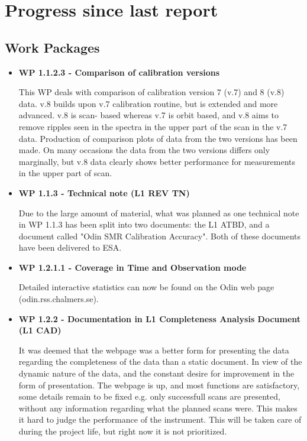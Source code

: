 \chapter{Progress since last report}
\label{chapter:progress}


\section{Work Packages}

\begin{itemize}

\item{\bf WP 1.1.2.3 - Comparison of calibration versions}

This WP deals with comparison of calibration version 7 (v.7) and 8 (v.8) data. v.8
builds upon v.7 calibration routine, but is extended and more advanced. v.8 is scan-
based whereas v.7 is orbit based, and v.8 aims to remove ripples seen in the spectra
in the upper part of the scan in the v.7 data.
Production of comparison plots of data from the two versions has been made. On many
occasions the data from the two versions differs only marginally, but v.8 data clearly
shows better performance for measurements in the upper part of scan.


\item{\bf WP 1.1.3 - Technical note (L1 REV TN)}

Due to the large amount of material, what was planned as one technical note in WP
1.1.3 has been split into two documents: the L1 ATBD, and a document called "Odin
SMR Calibration Accuracy". Both of these documents have been delivered to ESA. 


\item{\bf WP 1.2.1.1 - Coverage in Time and Observation mode}

Detailed interactive statistics can now be found on the Odin web page (odin.rss.chalmers.se). 


\item{\bf WP 1.2.2 - Documentation in L1 Completeness Analysis Document (L1 CAD)
}

It was deemed that the webpage was a better form for presenting the data regarding the completeness of the data than a static document. In view of the dynamic nature of the data, and the constant desire for improvement in the form of presentation. The webpage is up, and most functions are satisfactory, some details remain to be fixed e.g. only successfull scans are presented, without any information regarding what the planned scans were. This makes it hard to judge the performance of the instrument. This will be taken care of during the project life, but right now it is not prioritized. 



\end{itemize}
